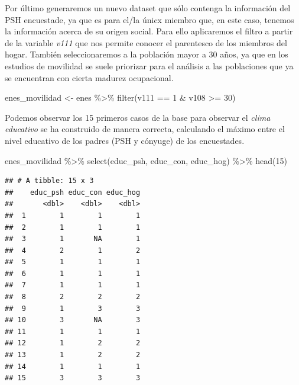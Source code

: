 \documentclass[
]{book}
\newenvironment{Shaded}{\begin{snugshade}}{\end{snugshade}}
\newcommand{\DecValTok}[1]{\textcolor[rgb]{0.00,0.00,0.81}{#1}}
\newcommand{\FunctionTok}[1]{\textcolor[rgb]{0.00,0.00,0.00}{#1}}
\newcommand{\NormalTok}[1]{#1}
\newcommand{\OtherTok}[1]{\textcolor[rgb]{0.56,0.35,0.01}{#1}}
\newcommand{\SpecialCharTok}[1]{\textcolor[rgb]{0.00,0.00,0.00}{#1}}
\begin{document}
Por último generaremos un nuevo dataset que sólo contenga la información del PSH encuestade, ya que es para el/la únicx miembro que, en este caso, tenemos la información acerca de su origen social. Para ello aplicaremos el filtro a partir de la variable \emph{v111} que nos permite conocer el parentesco de los miembros del hogar. También seleccionaremos a la población mayor a 30 años, ya que en los estudios de movilidad se suele priorizar para el análisis a las poblaciones que ya se encuentran con cierta madurez ocupacional.

\begin{Shaded}
\begin{Highlighting}[]
\NormalTok{enes\_movilidad }\OtherTok{\textless{}{-}}\NormalTok{ enes }\SpecialCharTok{\%\textgreater{}\%} 
    \FunctionTok{filter}\NormalTok{(v111 }\SpecialCharTok{==} \DecValTok{1} \SpecialCharTok{\&}\NormalTok{ v108 }\SpecialCharTok{\textgreater{}=} \DecValTok{30}\NormalTok{)}
\end{Highlighting}
\end{Shaded}

Podemos observar los 15 primeros casos de la base para observar el \emph{clima educativo} se ha construido de manera correcta, calculando el máximo entre el nivel educativo de los padres (PSH y cónyuge) de los encuestades.

\begin{Shaded}
\begin{Highlighting}[]
\NormalTok{enes\_movilidad }\SpecialCharTok{\%\textgreater{}\%} 
    \FunctionTok{select}\NormalTok{(educ\_psh, educ\_con, educ\_hog) }\SpecialCharTok{\%\textgreater{}\%} 
    \FunctionTok{head}\NormalTok{(}\DecValTok{15}\NormalTok{)}
\end{Highlighting}
\end{Shaded}

\begin{verbatim}
## # A tibble: 15 x 3
##    educ_psh educ_con educ_hog
##       <dbl>    <dbl>    <dbl>
##  1        1        1        1
##  2        1        1        1
##  3        1       NA        1
##  4        2        1        2
##  5        1        1        1
##  6        1        1        1
##  7        1        1        1
##  8        2        2        2
##  9        1        3        3
## 10        3       NA        3
## 11        1        1        1
## 12        1        2        2
## 13        1        2        2
## 14        1        1        1
## 15        3        3        3
\end{verbatim}
\end{document}
